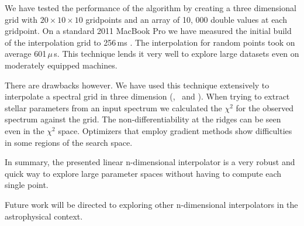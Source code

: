 We have tested the performance of the algorithm by creating a three dimensional grid with $20\times10\times10$ gridpoints and an array of 10, 000  double values at each gridpoint. 
On a standard 2011 MacBook Pro we have measured the initial build of the interpolation grid to 256\,ms
. The interpolation for random points took on average 601\,$\mu$\,s. This technique lends it very well to explore large datasets even on moderately equipped machines. 

There are drawbacks however. We have used this technique extensively to interpolate a spectral grid in three dimension (\teff, \logg\ and \feh). When trying to extract stellar parameters from an input spectrum we calculated the $\chi^2$ for the observed spectrum against the grid. The non-differentiability at the ridges can be seen even in the $\chi^2$ space. Optimizers that employ gradient methods \citep[such as MIGRAD][]{James:1975dr} show difficulties in some regions of the search space.

In summary, the presented linear n-dimensional interpolator is a very robust and quick way to explore large parameter spaces without having to compute each single point. 

Future work will be directed to exploring other n-dimensional interpolators in the astrophysical context. 

